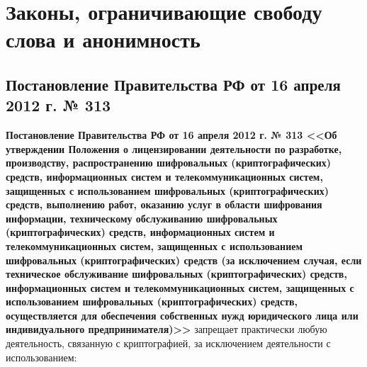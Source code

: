 \chapter{Законы, ограничивающие свободу слова и анонимность}
\section{Постановление Правительства РФ от 16 апреля 2012 г. № 313}
\textbf{Постановление Правительства РФ от 16 апреля 2012 г. № 313 <<Об утверждении Положения о лицензировании деятельности по разработке, производству, распространению шифровальных (криптографических) средств, информационных систем и телекоммуникационных систем, защищенных с использованием шифровальных (криптографических) средств, выполнению работ, оказанию услуг в области шифрования информации, техническому обслуживанию шифровальных (криптографических) средств, информационных систем и телекоммуникационных систем, защищенных с использованием шифровальных (криптографических) средств (за исключением случая, если техническое обслуживание шифровальных (криптографических) средств, информационных систем и телекоммуникационных систем, защищенных с использованием шифровальных (криптографических) средств, осуществляется для обеспечения собственных нужд юридического лица или индивидуального предпринимателя)>>} запрещает практически любую деятельность, связанную с криптографией, за исключением деятельности с использованием:
